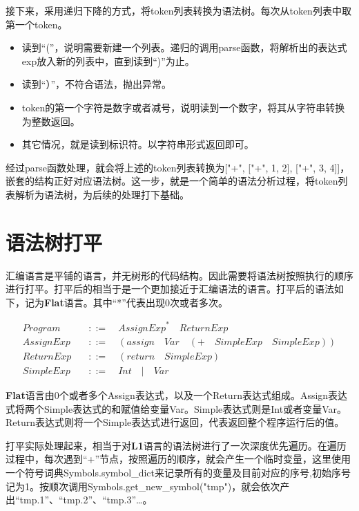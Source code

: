 接下来，采用递归下降的方式，将token列表转换为语法树。每次从token列表中取第一个token。
\begin{itemize}
  \item 读到“(”，说明需要新建一个列表。递归的调用parse函数，将解析出的表达式exp放入新的列表中，直到读到“)”为止。
  \item 读到“）”，不符合语法，抛出异常。
  \item token的第一个字符是数字或者减号，说明读到一个数字，将其从字符串转换为整数返回。
  \item 其它情况，就是读到标识符。以字符串形式返回即可。
\end{itemize}

经过parse函数处理，就会将上述的token列表转换为["+", ["+", 1, 2], ["+", 3, 4]]，嵌套的结构正好对应语法树。这一步，就是一个简单的语法分析过程，将token列表解析为语法树，为后续的处理打下基础。

\section{语法树打平}

汇编语言是平铺的语言，并无树形的代码结构。因此需要将语法树按照执行的顺序进行打平。打平后的相当于是一个更加接近于汇编语法的语言。打平后的语法如下，记为\textbf{Flat}语言。其中“*”代表出现0次或者多次。

\begin{equation}
\begin{aligned}
  \label{eq:3}
   Program \quad &::= \quad {AssignExp}^* \quad ReturnExp \\
   AssignExp \quad &::= \quad (assign \quad Var \quad (+ \quad SimpleExp \quad SimpleExp)) \\
   ReturnExp \quad &::= \quad (return \quad SimpleExp) \\
   SimpleExp \quad &::=  \quad Int \quad | \quad Var
\end{aligned}
\end{equation}

\textbf{Flat}语言由0个或者多个Assign表达式，以及一个Return表达式组成。Assign表达式将两个Simple表达式的和赋值给变量Var。Simple表达式则是Int或者变量Var。Return表达式则将一个Simple表达式进行返回，代表返回整个程序运行后的值。

打平实际处理起来，相当于对\textbf{L1}语言的语法树进行了一次深度优先遍历。在遍历过程中，每次遇到“+”节点，按照遍历的顺序，就会产生一个临时变量，这里使用一个符号词典Symbols.symbol\_dict来记录所有的变量及目前对应的序号,初始序号记为1。按顺次调用Symbols.get\_new\_symbol("tmp")，就会依次产出“tmp.1”、“tmp.2”、“tmp.3”…。

